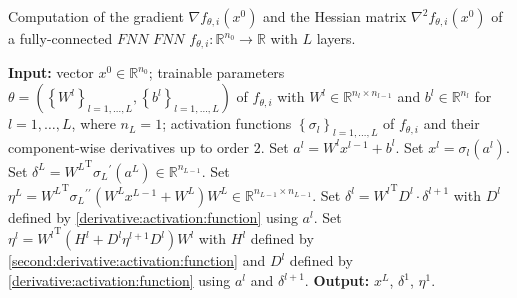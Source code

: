 \begin{algorithm}[H]
    \caption{Computation of the gradient $\nabla f_{\theta, i} \left(x^0\right)$ and the Hessian matrix $\nabla^{2} f_{\theta, i} \left(x^0\right)$ of a fully-connected $FNN$ $FNN$ $f_{\theta, i} \colon \mathbb{R}^{n_0} \to \mathbb{R}$ with $L$ layers.} \label{Algorithm 1}
    \begin{algorithmic}[1]
        \State \textbf{Input:} vector $x^0 \in \mathbb{R}^{n_0}$; trainable parameters $\theta = \left(\left\{ W^l \right\}_{l = 1, \ldots, L}, \left\{ b^l \right\}_{l = 1, \ldots, L}\right)$ of $f_{\theta, i}$ with $W^l \in \mathbb{R}^{n_l \times n_{l-1}}$ and $b^l \in \mathbb{R}^{n_l}$ for $l = 1, \ldots, L$, where $n_L = 1$; activation functions $\left\{ \sigma_{l} \right\}_{l = 1, \ldots, L}$ of $f_{\theta, i}$ and their component-wise derivatives up to order $2$.
            \State Set $a^l = W^l x^{l-1} + b^l$.
            \State Set $x^l = \sigma_l\left( a^l \right)$.
        \EndFor
        \State Set $\delta^{L} = {W^{L}}^{\mathrm{T}} {\sigma_{L}}^{\prime} \left( a^L \right) \in \mathbb{R}^{n_{L-1}}$.
        \State Set $\eta^{L} = {W^L}^{\mathrm{T}} {\sigma_L}^{\prime \prime} \left(W^L x^{L-1}  + W^L \right) W^L \in \mathbb{R}^{n_{L-1} \times n_{L-1}}$.
            \State Set $\delta^{l} = {W^{l}}^{\mathrm{T}} D^l \cdot \delta^{l+1}$ with $D^l$ defined by \cref{derivative:activation:function} using $a^l$.
            \State Set $\eta^{l} = {W^{l}}^{\mathrm{T}} \left( H^{l} + D^{l} \eta^{l+1} D^{l} \right) W^{l}$ with $H^l$ defined by \cref{second:derivative:activation:function} and 
            \StatexIndent[1] $D^l$ defined by \cref{derivative:activation:function} using $a^l$ and $\delta^{l+1}$.
        \EndFor
        \State \textbf{Output:} $x^L$, $\delta^1$, $\eta^1$.
    \end{algorithmic}
\end{algorithm}

